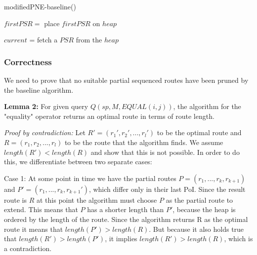 \raggedbottom

\begin{algorithm}[H]
\caption{modifiedPNE-baseline()}
\label{alg:mPNE_baseline}
	
	
	$firstPSR =$\;
	place $firstPSR$ on $heap$\;
	
	$current$ = fetch a $PSR$ from the $heap$\;
	
\end{algorithm}

\subsubsection{Correctness}
We need to prove that no suitable partial sequenced routes have been pruned by the baseline algorithm.

\textbf{Lemma 2:} For given query $Q(sp, M, EQUAL(i, j))$, the algorithm for the "equality" operator returns an optimal route in terms of route length.

\textit{Proof by contradiction:} Let $R' = (r_1', r_2', ..., r_l')$ to be the optimal route and $R = (r_1, r_2, ..., r_l)$ to be the route that the algorithm finds. We assume $length(R') < length(R)$ and show that this is not possible. In order to do this, we differentiate between two separate cases: 

Case 1: At some point in time we have the partial routes $P = (r_1, ..., r_k, r_{k+1})$ and $P' = (r_1, ..., r_k, r_{k+1}')$, which differ only in their last PoI. Since the result route is $R$ at this point the algorithm must choose $P$ as the partial route to extend. This means that $P$ has a shorter length than $P'$, because the heap is ordered by the length of the route. Since the algorithm returns R as the optimal route it means that $length(P') > length(R)$. But because it also holds true that $length(R') > length(P')$, it implies $length(R') > length(R)$, which is a contradiction.

